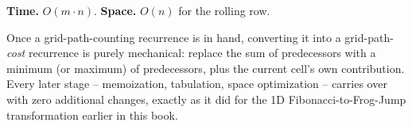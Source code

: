 \begin{complexitybox}
\textbf{Time.} $O(m \cdot n)$.
\textbf{Space.} $O(n)$ for the rolling row.
\end{complexitybox}

\begin{takeawaybox}
Once a grid-path-counting recurrence is in hand, converting it into a
grid-path-\emph{cost} recurrence is purely mechanical: replace the sum
of predecessors with a minimum (or maximum) of predecessors, plus the
current cell's own contribution. Every later stage -- memoization,
tabulation, space optimization -- carries over with zero additional
changes, exactly as it did for the 1D Fibonacci-to-Frog-Jump
transformation earlier in this book.
\end{takeawaybox}
